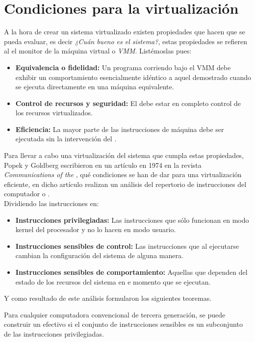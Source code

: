 \section{Condiciones para la virtualización}

A la hora de crear un sistema virtualizado existen propiedades que hacen que se pueda evaluar, es decir \emph{¿Cuán bueno es el sistema?}, estas propiedades se refieren al el monitor de la máquina virtual o \emph{VMM}. Listémoslas pues:
\begin{itemize}
\item \textbf{Equivalencia o fidelidad:} Un programa corriendo bajo el VMM debe exhibir un comportamiento  esencialmente idéntico a aquel demostrado cuando se ejecuta directamente en una máquina equivalente.
\item \textbf{Control de recursos y seguridad:} El  debe estar en completo control de los recursos virtualizados.
\item \textbf{Eficiencia:} La mayor parte de las instrucciones de máquina debe ser ejecutada sin la intervención del .
\end{itemize}

Para llevar a cabo una virtualización del sistema que cumpla estas propiedades, Popek y Goldberg escribieron en un artículo en 1974 en la revista \emph{Communications of the }\cite{reqvir}, qué condiciones se han de dar para una virtualización eficiente, en dicho artículo realizan un análisis del repertorio de instrucciones del computador o .\\

Dividiendo las instrucciones en:
\begin{itemize}
\item \textbf{Instrucciones privilegiadas:} Las instrucciones que sólo funcionan en modo kernel del procesador y no lo hacen en modo usuario.
\item \textbf{Instrucciones sensibles de control:} Las instrucciones que al ejecutarse cambian la configuración del sistema de alguna manera.
\item \textbf{Instrucciones sensibles de comportamiento:} Aquellas que dependen del estado de los recursos del sistema en e momento que se ejecutan. 
\end{itemize}

Y como resultado de este análisis formularon los siguientes teoremas.
\begin{teorema}
Para cualquier computadora convencional de tercera generación, se puede construir un  efectivo si el conjunto de instrucciones sensibles es un subconjunto de las instrucciones privilegiadas.
\end{teorema}

